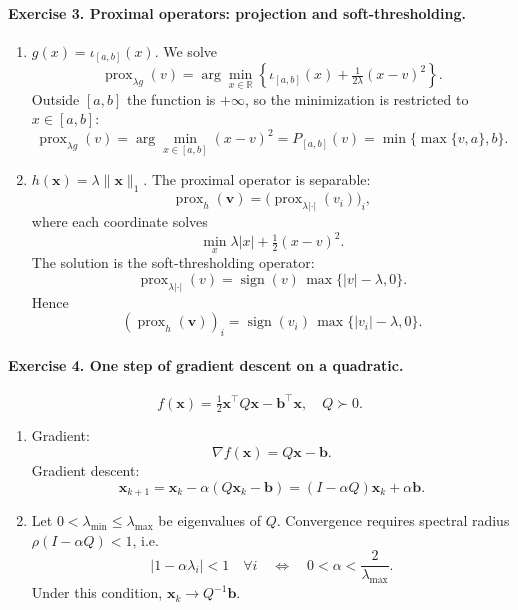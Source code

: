 \documentclass[11pt]{article}
\begin{document}
\bigskip

\paragraph{Exercise 3. Proximal operators: projection and soft-thresholding.}

\begin{enumerate}
\item $g(x)=\iota_{[a,b]}(x)$. We solve
\[
\operatorname{prox}_{\lambda g}(v)
=
\arg\min_{x\in\mathbb{R}}
\left\{
\iota_{[a,b]}(x) + \tfrac{1}{2\lambda}(x-v)^2
\right\}.
\]
Outside $[a,b]$ the function is $+\infty$, so the minimization is restricted to $x\in[a,b]$:
\[
\operatorname{prox}_{\lambda g}(v)
= \arg\min_{x\in[a,b]} (x-v)^2
= P_{[a,b]}(v)
= \min\{\max\{v,a\},b\}.
\]

\item $h(\bm{x})=\lambda\|\bm{x}\|_1$. The proximal operator is separable:
\[
\operatorname{prox}_{h}(\bm{v})
= \bigl(\operatorname{prox}_{\lambda|\cdot|}(v_i)\bigr)_i,
\]
where each coordinate solves
\[
\min_x \lambda|x| + \tfrac12(x-v)^2.
\]
The solution is the soft-thresholding operator:
\[
\operatorname{prox}_{\lambda|\cdot|}(v)
= \operatorname{sign}(v)\,\max\{|v|-\lambda,0\}.
\]
Hence
\[
(\operatorname{prox}_{h}(\bm{v}))_i
= \operatorname{sign}(v_i)\,\max\{|v_i|-\lambda,0\}.
\]
\end{enumerate}

\bigskip

\paragraph{Exercise 4. One step of gradient descent on a quadratic.}

\[
f(\bm{x})=\tfrac{1}{2}\bm{x}^\top Q \bm{x}-\bm{b}^\top\bm{x},\quad Q\succ0.
\]

\begin{enumerate}
\item Gradient:
\[
\nabla f(\bm{x}) = Q\bm{x}-\bm{b}.
\]
Gradient descent:
\[
\bm{x}_{k+1} = \bm{x}_k - \alpha(Q\bm{x}_k - \bm{b})
= (I-\alpha Q)\bm{x}_k + \alpha\bm{b}.
\]

\item Let $0<\lambda_{\min}\le\lambda_{\max}$ be eigenvalues of $Q$.  
Convergence requires spectral radius $\rho(I-\alpha Q)<1$, i.e.
\[
|1-\alpha\lambda_i|<1 \quad \forall i
\quad\Longleftrightarrow\quad
0<\alpha<\frac{2}{\lambda_{\max}}.
\]
Under this condition, $\bm{x}_k\to Q^{-1}\bm{b}$.
\end{enumerate}
\end{document}
